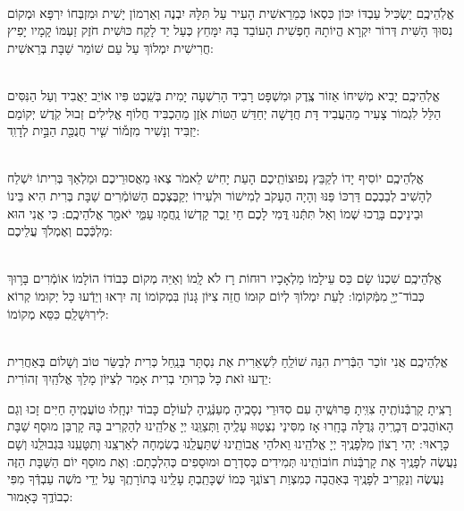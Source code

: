 \documentclass[twoside, openany, parskip=half, 11pt]{book}
\begin{document}
\begin{footnotesize}
\\
אֱלֹֽהֵיכֶֽם יַשְׂכִּיל עַבְדּוֹ יִכּוֹן כִּסְאוֹ כְּמֵרֵאשִׁית הָעִיר עַל תִּלָּהּ יִבְנֶה וְאַרְמוֹן יָשִׁית וּמִזְבְּחוֹ יִרְפָּא וּמְקוֹם נִסּוּךְ הָשִּׁית דְּרוֹר יִקְרָא הֱיוֹתָהּ חָפְשִׁית הָעוֹבֵד בָּהּ יִמָּחֵץ כְּעַל יַד לָקַח כּוּשִׁית חֹזֶק זַעְמּוֹ קָמָיו יָפִיץ חֲרִישִׁית יִמְלוֹךְ עַל עַם שׁוֹמֵר שַׁבָּת בְּרֵאשִׁית: 

\\
אֱלֹֽהֵיכֶֽם יָבִיא מְשִׁיחוֹ אֵזוֹר צֶֽדֶק וּמִשְׁפָּט רָבִיד הָרִשְׁעָה יָמִית בְּשֵֽׁבֶט פִּיו אוֹיֵב יַאֲבִיד וְעַל הַנִּסִּים הַלֵּל לִגְמוֹר צָעִיר מֵהַעֲבִיד דָּת חֲדָשָׁה יְחַדֵּשׁ הַטּוֹת אֹֽזֶן מֵהַכְבִּיד חֲלוֹף אֱלִילִים זְבוּל קֹֽדֶשׁ יְקוֹמֵם יַזְבִּיד וְנָשִׁיר  מִזְמ֡וֹר שִׁ֤יר חֲנֻכַּ֖ת הַבַּ֣יִת לְדָוִֽד:

\\
אֱלֹֽהֵיכֶֽם יוֹסִיף יָדוֹ לְקַבֵּץ נְפוּצוֹתֵֽיכֶם הָעֵת יָחִישׁ לֵאמֹר צְאוּ מֵאֲסוּרֵיכֶם וּמַלְאַךְ בְּרִיתוֹ יִשְׁלַח לְהָשִׁיב לְבַבְכֶם דַּרְכּוֹ פַּנּוּ וְהָיָה הֶעָקֹב לְמִישׁוֹר וּלְעִירוֹ יְקַבֶּצְכֶם הַשּׁוֹמְֿרִים שַׁבָּת בְּרִית הִיא בֵּינוֹ וּבֵינֵיכֶם בָּרֲכוּ שְׁמוֹ וְאַל תִּתְּֿנוּ דֳּמִי לָכֶם חַי זֵֽכֶר קָדְשׁוֹ נַֽחֲמ֖וּ עַמִּ֑י יֹאמַ֖ר אֱלֹהֵיכֶֽם: כִּי אֲנִי הוּא מַלְכְּֿכֶם וְאֶמְלֹךְ עֲלֵיכֶם:


\\
אֱלֹֽהֵיכֶֽם שִׁכְנוֹ שָׂם כֵּס עֵילָמוֹ מַלְאָכָיו רוּחוֹת רָז לֹא לָֽמוֹ וְאַיֵּה מְקוֹם כְּבוֹדוֹ הוֹלָמוֹ אוֹמְֿרִים בָּר֥וּךְ כְּבוֹד־יְיָ֖ מִמְּֿקוֹמֽוֹ: לָעֵת יִמְלוֹךְ לְיוֹם קוּמוֹ חֲזֵה צִיּוֹן גָּנוֹן בִּמְקוֹמוֹ זֶה יִרְאוּ וְיֵדְֿעוּ כָּל יְקוּמוֹ קְרוֹא לִירֽוּשָׁלַֽםִ כִּסֵּא מְקוֹמוֹ: 

\\
אֱלֹֽהֵיכֶֽם אֲנִי זוֹכֵר הַבְּֿרִית הִנֵּה שׁוֹלֵֽחַ לִשְׁאֵרִית אֶת נִסְתָּר בְּנַֽחַל כְּרִית לְבַשֵּׂר טוֹב וְשָׁלוֹם בְּאַחֲרִית יֵדְעוּ זֹאת כָּל כְּרֽוּתֵי בְרִית אָמַר לְצִיּוֹן מָלַךְ אֱלֹהַֽיִךְ זְהוֹרִית: 

\end{footnotesize}



\sepline

\shabboskiddushhashem 

 \pageref{shabbosroshchodesh}
 
 רָצִֽיתָ קָרְבְּֿנוֹתֶֽיהָ צִוִּֽיתָ פֵּרוּשֶֽׁיהָ עִם סִדּוּרֵי נְסָכֶֽיהָ מְעַנְּֿגֶֽיהָ לְעוֹלָם כָּבוֹד יִנְחָֽלוּ טוֹעֲמֶֽיהָ חַיִּים זָכוּ וְגַם הָאוֹהֲבִים דְּבָרֶֽיהָ גְּדֻלָּה בָּחָֽרוּ אָז מִסִּינַי נִצְטַוּוּ עָלֶֽיהָ 
וַתְּצַוֵּֽנוּ יְיָ אֱלֹהֵֽינוּ לְהַקְרִיב בָּהּ קָרְבַּן מוּסַף שַׁבָּת כָּרָאוּי: יְהִי רָצוֹן מִלְּפָנֶֽיךָ יְיָ אֱלֹהֵֽינוּ וֵאלֹהֵי אֲבוֹתֵֽינוּ שֶׁתַּעֲלֵֽנוּ בְשִׂמְחָה לְאַרְצֵֽנוּ וְתִטָּעֵֽנוּ בִּגְבוּלֵֽנוּ וְשָׁם נַעֲשֶׂה לְפָנֶֽיךָ אֶת קָרְבְּֿנוֹת חוֹבוֹתֵֽינוּ תְּמִידִים כְּסִדְרָם וּמוּסָפִים כְּהִלְכָתָם: וְאֶת מוּסַף יוֹם הַשַּׁבָּת הַזֶּה נַעֲשֶׂה וְנַקְרִיב לְפָנֶֽיךָ בְּאַהֲבָה כְּמִצְוַת רְצוֹנֶֽךָ כְּמוֹ שֶׁכָּתַֽבְתָּ עָלֵֽינוּ בְּתוֹרָתֶֽךָ עַל יְדֵי מֹשֶׁה עַבְדְּֿךָ מִפִּי כְבוֹדֶֽךָ כָּאָמוּר:
\end{document}
